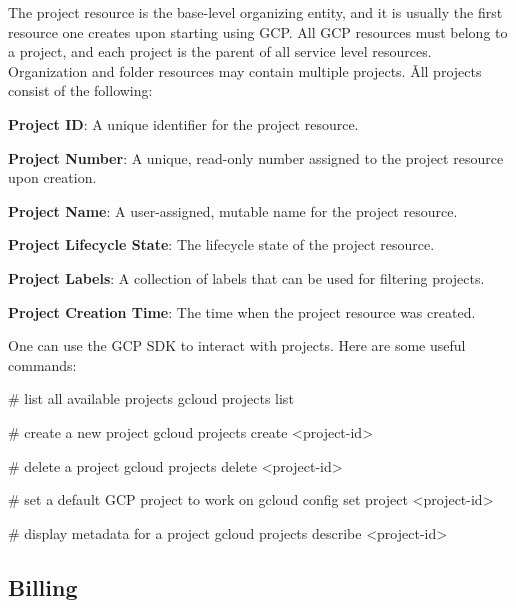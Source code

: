 The project resource is the base-level organizing entity, and it is usually the first resource one creates upon starting
using GCP. All GCP resources must belong to a project, and each project is the parent of all service level resources.
Organization and folder resources may contain multiple projects. \v

All projects consist of the following:
\bit
\item \textbf{Project ID}: A unique identifier for the project resource.
\item \textbf{Project Number}: A unique, read-only number assigned to the project resource upon creation.
\item \textbf{Project Name}: A user-assigned, mutable name for the project resource.
\item \textbf{Project Lifecycle State}: The lifecycle state of the project resource.
\item \textbf{Project Labels}: A collection of labels that can be used for filtering projects.
\item \textbf{Project Creation Time}: The time when the project resource was created.
\eit


One can use the GCP SDK to interact with projects. Here are some useful commands:
\begin{bash}
# list all available projects
gcloud projects list
\end{bash}

\begin{bash}
# create a new project
gcloud projects create <project-id>
\end{bash}

\begin{bash}
# delete a project
gcloud projects delete <project-id>
\end{bash}

\begin{bash}
# set a default GCP project to work on
gcloud config set project <project-id>
\end{bash}

\begin{bash}
# display metadata for a project
gcloud projects describe <project-id>
\end{bash}

\subsection{Billing}

